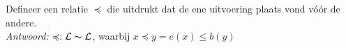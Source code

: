 
\item Defineer een relatie $\preccurlyeq$ die uitdrukt dat de ene uitvoering plaats vond v\'{o}\'{o}r de andere. \\


\emph{Antwoord:} $\preccurlyeq : \mathcal{L} \thicksim \mathcal{L}$, waarbij $x \preccurlyeq y = e(x) \leq b(y)$ \\

